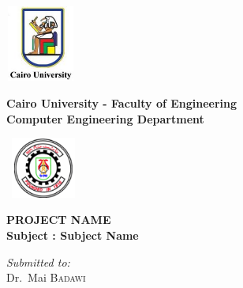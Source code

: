 \documentclass[a4paper,12pt]{report}
\begin{document}
\begin{titlepage}
\begin{center}
	\begin{minipage}{2.5cm}
	\begin{center}
		\includegraphics[width=2.3cm,height=2.5cm]{slogan.jpg}
	\end{center}
\end{minipage}\hfill
\begin{minipage}{10cm}
	\begin{center}
  {\bfseries\large Cairo University - Faculty of Engineering}\\[0.1cm]
  {\bfseries\large Computer Engineering Department}\\[0.1cm]
  \end{center}

\end{minipage}\hfill
\begin{minipage}{2.5cm}
	\begin{center}
		\includegraphics[width=2.5cm,height=2cm]{logo_cufe.png}
	\end{center}

\end{minipage}

\vspace{5cm}

{\Huge \bfseries \uppercase{Project Name} \\[0.5cm] }
{\LARGE \bfseries Subject : Subject Name}
\textsc{\Large }\\[1cm]

\vspace{5cm}

\begin{minipage}{15cm}
  \begin{flushleft} \huge
    \emph{Submitted to:}\\
    Dr.~Mai \textsc{Badawi}\\
  \end{flushleft}
\end{minipage}


\end{center}
\end{titlepage}
\end{document}
